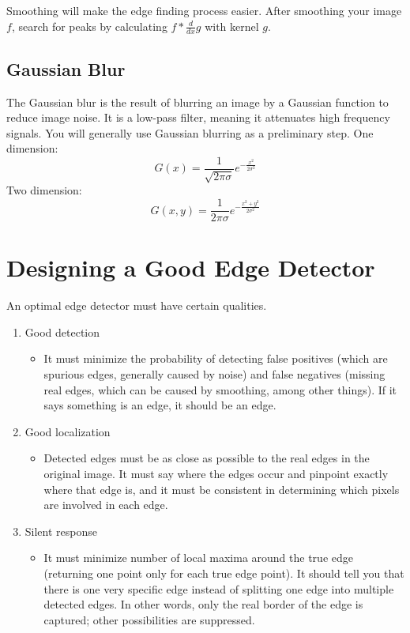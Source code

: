 \documentclass{article}
\begin{document}
Smoothing will make the edge finding process easier. After smoothing your image $f$, search for peaks by calculating $f * \frac{d}{dx}g$ with kernel $g$.

\subsection{Gaussian Blur}

The Gaussian blur is the result of blurring an image by a Gaussian function to reduce image noise. It is a low-pass filter, meaning it attenuates high frequency signals. You will generally use Gaussian blurring as a preliminary step.
\newline
One dimension:
$$G(x) = \frac{1}{\sqrt{2\pi\sigma}}e^{-\frac{x^2}{2\sigma^2}}$$
Two dimension:
$$G(x,y) = \frac{1}{2\pi\sigma}e^{-\frac{x^2+y^2}{2\sigma^2}}$$


\section{Designing a Good Edge Detector}
An optimal edge detector must have certain qualities.
\begin{enumerate}
    \item Good detection
    \begin{itemize}
        \item It must minimize the probability of detecting false positives (which are spurious edges, generally caused by noise) and false negatives (missing real edges, which can be caused by smoothing, among other things). If it says something is an edge, it should be an edge.
    \end{itemize}
    \item Good localization
    \begin{itemize}
        \item Detected edges must be as close as possible to the real edges in the original image. It must say where the edges occur and pinpoint exactly where that edge is, and it must be consistent in determining which pixels are involved in each edge.
    \end{itemize}
    \item Silent response
    \begin{itemize}
        \item It must minimize number of local maxima around the true edge (returning one point only for each true edge point). It should tell you that there is one very specific edge instead of splitting one edge into multiple detected edges. In other words, only the real border of the edge is captured; other possibilities are suppressed.
    \end{itemize}
\end{enumerate}

% 
% 
\end{document}
